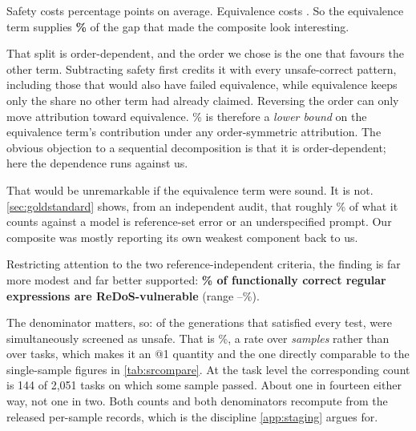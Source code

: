\documentclass[11pt]{article}
\newcommand{\pass}{\textsc{pass}}
\newcommand{\usable}{\textsc{usable}}
\begin{document}
\begin{table}[htbp]
\centering
\footnotesize
\setlength{\tabcolsep}{4pt}

\caption{Decomposition of the \pass{}$\to$\usable{} gap. ``C\&S'' is
correct-and-secure: correctness conjoined with safety, omitting the
equivalence term. The final column is the share of functionally correct
patterns that are ReDoS-vulnerable, and is the one column here computed
\emph{per sample} rather than @3: it is a rate over generations, and the @3
form would answer a different question. Denominators are \cref{tab:at1}'s
restricted ones (tasks with fewer than three samples are excluded), which
is why \texttt{kimi-k3} reads 46.5 here.}
\label{tab:decomp}
\end{table}

Safety costs \safetyloss{} percentage points on average. Equivalence costs
\equivloss{}. So the equivalence term supplies \textbf{\equivshare{}\%} of the
gap that made the composite look interesting.

That split is order-dependent, and the order we chose is the one that favours
the other term. Subtracting safety first credits it with every unsafe-correct
pattern, including those that would also have failed equivalence, while
equivalence keeps only the share no other term had already claimed. Reversing
the order can only move attribution toward equivalence. \equivshare{}\% is
therefore a \emph{lower bound} on the equivalence term's contribution under
any order-symmetric attribution. The obvious objection to a sequential
decomposition is that it is order-dependent; here the dependence runs against
us.

That would be unremarkable if the equivalence term were sound. It is not.
\cref{sec:goldstandard} shows, from an independent audit, that roughly \auditcomplement{}\% of
what it counts against a model is reference-set error or an underspecified
prompt. Our composite was mostly reporting its own weakest component back to
us.

Restricting attention to the two reference-independent criteria, the finding
is far more modest and far better supported: \textbf{\vulngivencorrect{}\% of functionally
correct regular expressions are ReDoS-vulnerable} (range \vgclo{}--\vgchi{}\%).

The denominator matters, so: of the \correctsamples{} generations that
satisfied every test, \correctvulnsamples{} were simultaneously screened as
unsafe. That is \vulngivencorrect{}\%, a rate over \emph{samples} rather than
over tasks, which makes it an @1 quantity and the one directly comparable to
the single-sample figures in \cref{tab:srcompare}. At the task level the
corresponding count is 144 of 2{,}051 tasks on which some sample passed. About
one in fourteen either way, not one in two. Both counts and both denominators
recompute from the released per-sample records, which is the discipline
\cref{app:staging} argues for.
\end{document}
